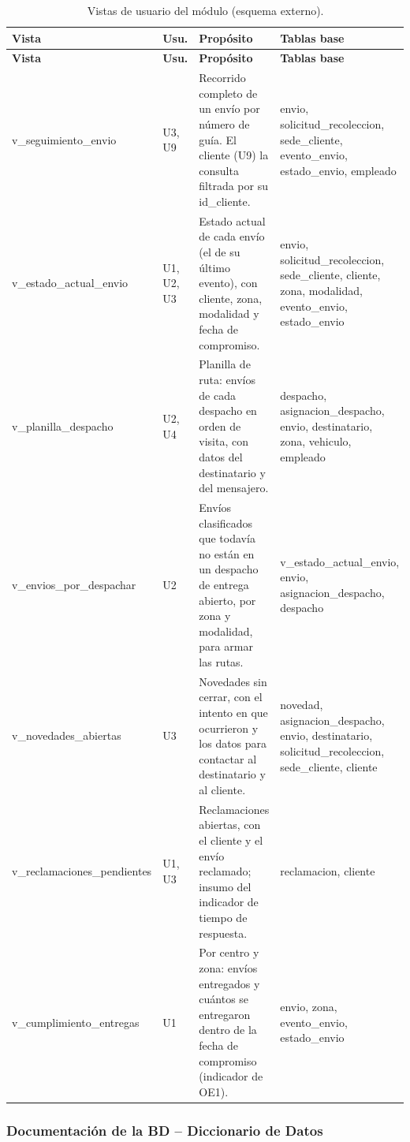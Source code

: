 {\singlespacing\small
\begin{longtable}{L{3.6cm} L{1.4cm} L{5.6cm} L{3.8cm}}
\caption{Vistas de usuario del módulo (esquema externo).}
\label{tab:vistas}\\
\toprule
\textbf{Vista} & \textbf{Usu.} & \textbf{Propósito} & \textbf{Tablas base} \\
\midrule
\endfirsthead
\toprule
\textbf{Vista} & \textbf{Usu.} & \textbf{Propósito} & \textbf{Tablas base} \\
\midrule
\endhead
\bottomrule
\endfoot
v\_seguimiento\_envio & U3, U9 & Recorrido completo de un envío por número de guía. El cliente (U9) la consulta filtrada por su id\_cliente. & envio, solicitud\_recoleccion, sede\_cliente, evento\_envio, estado\_envio, empleado \\
\midrule
v\_estado\_actual\_envio & U1, U2, U3 & Estado actual de cada envío (el de su último evento), con cliente, zona, modalidad y fecha de compromiso. & envio, solicitud\_recoleccion, sede\_cliente, cliente, zona, modalidad, evento\_envio, estado\_envio \\
\midrule
v\_planilla\_despacho & U2, U4 & Planilla de ruta: envíos de cada despacho en orden de visita, con datos del destinatario y del mensajero. & despacho, asignacion\_despacho, envio, destinatario, zona, vehiculo, empleado \\
\midrule
v\_envios\_por\_despachar & U2 & Envíos clasificados que todavía no están en un despacho de entrega abierto, por zona y modalidad, para armar las rutas. & v\_estado\_actual\_envio, envio, asignacion\_despacho, despacho \\
\midrule
v\_novedades\_abiertas & U3 & Novedades sin cerrar, con el intento en que ocurrieron y los datos para contactar al destinatario y al cliente. & novedad, asignacion\_despacho, envio, destinatario, solicitud\_recoleccion, sede\_cliente, cliente \\
\midrule
v\_reclamaciones\_pendientes & U1, U3 & Reclamaciones abiertas, con el cliente y el envío reclamado; insumo del indicador de tiempo de respuesta. & reclamacion, cliente \\
\midrule
v\_cumplimiento\_entregas & U1 & Por centro y zona: envíos entregados y cuántos se entregaron dentro de la fecha de compromiso (indicador de OE1). & envio, zona, evento\_envio, estado\_envio \\
\end{longtable}
\par}

\subsubsection{Documentación de la BD -- Diccionario de Datos}
\label{sec:diccionario}

